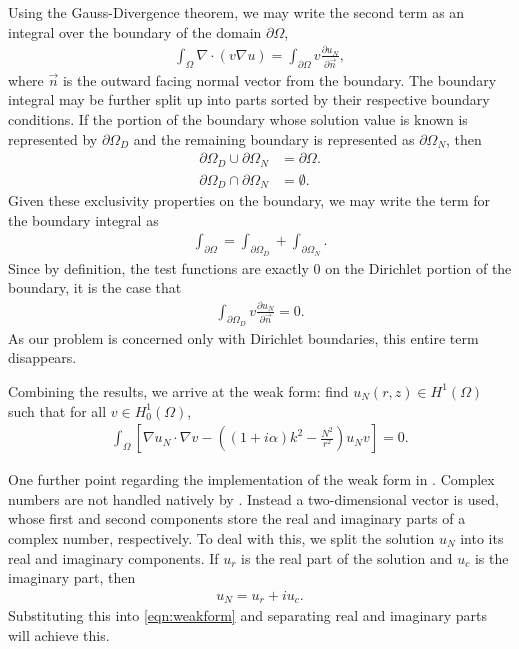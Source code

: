 Using the Gauss-Divergence theorem, we may write the second term as an integral over the boundary of the domain $\partial \Omega$,
\begin{align}
	\int_\Omega \nabla \cdot (v \nabla u ) = \int_{\partial\Omega} v \frac{\partial u_N}{\partial \vec{n}},
\end{align}
where $\vec{n}$ is the outward facing normal vector from the boundary.
The boundary integral may be further split up into parts sorted by their respective boundary conditions.
If the portion of the boundary whose solution value is known is represented by $\partial \Omega_D$ and the remaining boundary is represented as $\partial \Omega_N$, then
\begin{subequations}
\begin{align}
	\partial \Omega_D \cup \partial \Omega_N &= \partial \Omega. \\
	\partial \Omega_D \cap \partial \Omega_N &= \emptyset.
\end{align}
\end{subequations}
Given these exclusivity properties on the boundary, we may write the term for the boundary integral as
\begin{align}
	\int_{\partial\Omega} = \int_{\partial\Omega_D} + \int_{\partial\Omega_N}.
\end{align}
Since by definition, the test functions are exactly 0 on the Dirichlet portion of the boundary, it is the case that
\begin{align}
	\int_{\partial\Omega_D} v \frac{\partial u_N}{\partial \vec{n}} = 0.
\end{align}
As our problem is concerned only with Dirichlet boundaries, this entire term disappears.

Combining the results, we arrive at the weak form: find $u_N(r,z) \in H^1(\Omega)$ such that for all $v \in H^1_0(\Omega)$,
\begin{align}
	\int_\Omega \left[
		\nabla u_N \cdot \nabla v 
	  - \left((1+i\alpha)k^2 - \frac{N^2}{r^2}\right) u_N v 
	\right] = 0. \label{eqn:weakform}
\end{align}


One further point regarding the implementation of the weak form in \oomph.
Complex numbers are not handled natively by \oomph.
Instead a two-dimensional vector is used, whose first and second components store the real and imaginary parts of a complex number, respectively.
To deal with this, we split the solution $u_N$ into its real and imaginary components.
If $u_r$ is the real part of the solution and $u_c$ is the imaginary part, then
\begin{align}
	u_N = u_r + i u_c.
\end{align}
Substituting this into \eqref{eqn:weakform} and separating real and imaginary parts will achieve this.








